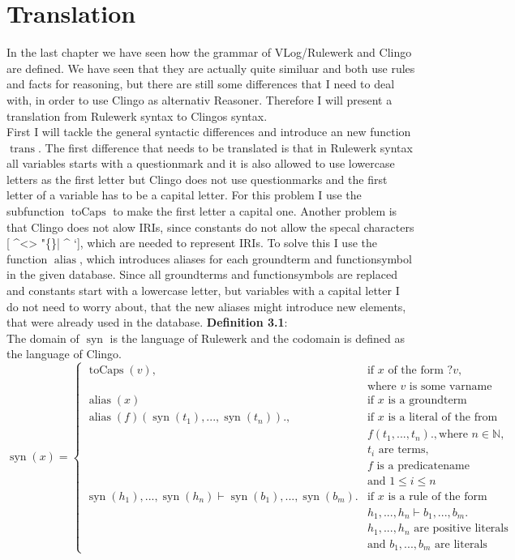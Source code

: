 \documentclass[hyperref, bachelorofscience]{cgvpub}
\renewenvironment{shaded}{%
  \def\FrameCommand{\fboxsep=\FrameSep \colorbox{shadecolor}}%
  \MakeFramed{\advance\hsize-\width \FrameRestore\FrameRestore}}%
 {\endMakeFramed}
\DeclareMathOperator{\trans}{trans}
\DeclareMathOperator{\syn}{syn}
\DeclareMathOperator{\alias}{alias}
\DeclareMathOperator{\toCaps}{toCaps}
\begin{document}
\chapter{Translation}
In the last chapter we have seen how the grammar of VLog/Rulewerk and Clingo are defined. We have seen that they are actually quite similuar and both use rules and facts for reasoning, but there are still some differences that I need to deal with, in order to use Clingo as alternativ Reasoner. Therefore I will present a translation from Rulewerk syntax to Clingos syntax.\\
First I will tackle the general syntactic differences and introduce an new function $\trans$. The first difference that needs to be translated is that in Rulewerk syntax all variables starts with a questionmark and it is also allowed to use lowercase letters as the first letter but Clingo does not use questionmarks and the first letter of a variable has to be a capital letter. For this problem I use the subfunction $\toCaps$ to make the first letter a capital one. Another problem is that Clingo does not alow IRIs, since constants do not allow the specal characters  [ \string^<> "\{\}| \string^ `], which are needed to represent IRIs. To solve this I use the function $\alias$, which introduces aliases for each groundterm and functionsymbol in the given database. Since all groundterms and functionsymbols are replaced and constants start with a lowercase letter, but variables with a capital letter I do not need to worry about, that the new aliases might introduce new elements, that were already used in the database.  
\begin{shaded}
\textbf{Definition 3.1}: \\
The domain of $\syn$ is the language of Rulewerk and the codomain is defined as the language of Clingo.\\
$ \syn (x) = 
\begin{cases}
\toCaps(v), & \text{if } x \text{ of the form } ?v,\\ & \text{where } v \text{ is some varname} \\
\alias(x) & \text{if } x \text{ is a groundterm} \\
\alias(f)( \syn (t_1) ,..., \syn (t_n))., & \text{if } x \text{ is a literal of the from}\\ 
& f(t_1,...,t_n). , \text{where } n \in \mathbb{N}, \\
& t_i \text{ are terms, } \\
& f \text{ is a predicatename}\\
& \text{and } 1 \leq i \leq n \\

\syn(h_1),...,\syn(h_n) \vdash \syn(b_1),...,\syn(b_m). & \text{if } x \text{ is a rule of the form} \\
& h_1,...,h_n \vdash b_1,...,b_m . \\
& h_1,...,h_n \text{ are positive literals} \\
& \text{and } b_1,...,b_m \text{ are literals}
\end{cases} $
\end{shaded}
\end{document}
